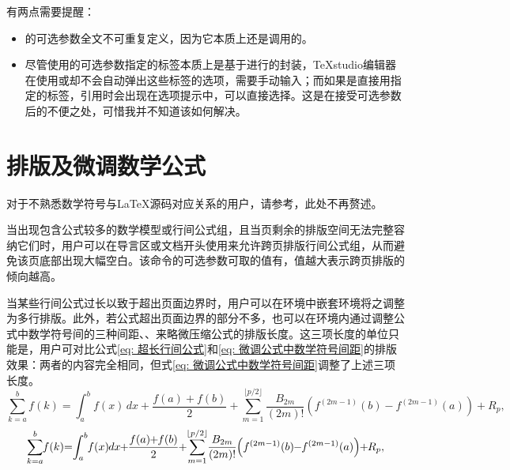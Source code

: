 \documentclass[doctor, vlined]{DissertUESTC}
\begin{document}
	有两点需要提醒：
	\begin{itemize}
		\item {}的可选参数全文不可重复定义，因为它本质上还是调用的。
		\item 尽管使用的可选参数指定的标签本质上是基于进行的封装，TeXstudio编辑器在使用或却不会自动弹出这些标签的选项，需要手动输入；而如果是直接用指定的标签，引用时会出现在选项提示中，可以直接选择。这是在接受可选参数后的不便之处，可惜我并不知道该如何解决。
	\end{itemize}
	
	
	\section{排版及微调数学公式}

	对于不熟悉数学符号与LaTeX源码对应关系的用户，请参考\href{https://www.cnblogs.com/1024th/p/11623258.html}{\color{DarkRed}}，此处不再赘述。

	当出现包含公式较多的数学模型或行间公式组，且当页剩余的排版空间无法完整容纳它们时，用户可以在导言区或文档开头使用来允许跨页排版行间公式组，从而避免该页底部出现大幅空白。该命令的可选参数可取的值有，值越大表示跨页排版的倾向越高。

	当某些行间公式过长以致于超出页面边界时，用户可以在环境中嵌套环境将之调整为多行排版。此外，若公式超出页面边界的部分不多，也可以在环境内通过调整公式中数学符号间的三种间距、、来略微压缩公式的排版长度。这三项长度的单位只能是，用户可对比公式\eqref{eq: 超长行间公式}和\eqref{eq: 微调公式中数学符号间距}的排版效果：两者的内容完全相同，但式\eqref{eq: 微调公式中数学符号间距}调整了上述三项长度。
	\begin{equation} \label{eq: 超长行间公式}
		\sum_{k=a}^{b} f(k) = \int_{a}^{b} f(x) \, dx + \frac{f(a) + f(b)}{2} + \sum_{m=1}^{\lfloor p/2 \rfloor} \frac{B_{2m}}{(2m)!} \left( f^{(2m-1)}(b) - f^{(2m-1)}(a) \right) + R_p,
	\end{equation}
	\begin{equation} \label{eq: 微调公式中数学符号间距}
		\thinmuskip=-1mu \medmuskip=-1mu \thickmuskip=0mu
		\sum_{k=a}^{b} f(k) = \int_{a}^{b} f(x) \, dx + \frac{f(a) + f(b)}{2} + \sum_{m=1}^{\lfloor p/2 \rfloor} \frac{B_{2m}}{(2m)!} \left( f^{(2m-1)}(b) - f^{(2m-1)}(a) \right) + R_p,
	\end{equation}
\end{document}
